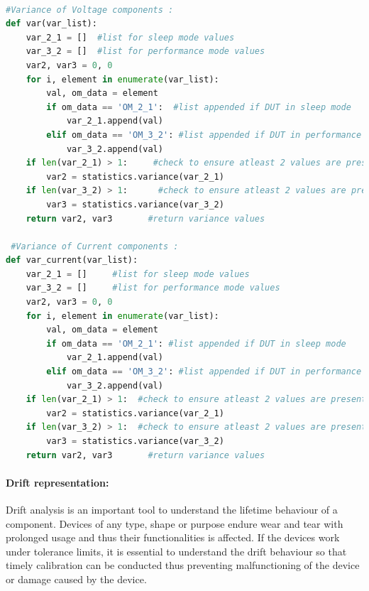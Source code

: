 \begin{lstlisting}[language = Python]

#Variance of Voltage components :
def var(var_list):
    var_2_1 = []  #list for sleep mode values
    var_3_2 = []  #list for performance mode values 
    var2, var3 = 0, 0
    for i, element in enumerate(var_list):
        val, om_data = element
        if om_data == 'OM_2_1':  #list appended if DUT in sleep mode
            var_2_1.append(val)     
        elif om_data == 'OM_3_2': #list appended if DUT in performance mode
            var_3_2.append(val)
    if len(var_2_1) > 1:     #check to ensure atleast 2 values are present in list to calculate variance
        var2 = statistics.variance(var_2_1)
    if len(var_3_2) > 1:      #check to ensure atleast 2 values are present in list to calculate variance
        var3 = statistics.variance(var_3_2)
    return var2, var3       #return variance values
 
 #Variance of Current components :
def var_current(var_list):
    var_2_1 = []     #list for sleep mode values
    var_3_2 = []     #list for performance mode values
    var2, var3 = 0, 0
    for i, element in enumerate(var_list):
        val, om_data = element
        if om_data == 'OM_2_1': #list appended if DUT in sleep mode
            var_2_1.append(val)
        elif om_data == 'OM_3_2': #list appended if DUT in performance mode
            var_3_2.append(val)
    if len(var_2_1) > 1:  #check to ensure atleast 2 values are present in list to calculate variance
        var2 = statistics.variance(var_2_1)
    if len(var_3_2) > 1:  #check to ensure atleast 2 values are present in list to calculate variance
        var3 = statistics.variance(var_3_2)
    return var2, var3       #return variance values
\end{lstlisting}


\paragraph{Drift representation:} Drift analysis is an important tool to understand the lifetime behaviour of a component. Devices of any type, shape or purpose endure wear and tear with prolonged usage and thus their functionalities is affected. If the devices work under tolerance limits, it is essential to understand the drift behaviour so that timely calibration can be conducted thus preventing malfunctioning of the device or damage caused by the device. 

